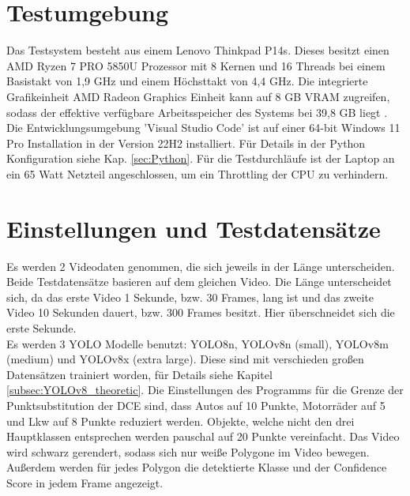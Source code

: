 \section{Testumgebung}{
	Das Testsystem besteht aus einem Lenovo Thinkpad P14s. Dieses besitzt einen AMD Ryzen 7 PRO 5850U Prozessor mit 8 Kernen und 16 Threads bei einem Basistakt von 1,9 GHz und einem Höchsttakt von 4,4 GHz. Die integrierte Grafikeinheit AMD Radeon Graphics Einheit kann auf 8 GB VRAM zugreifen, sodass der effektive verfügbare Arbeitsspeicher des Systems bei 39,8 GB liegt \citep{PSREF21}. Die Entwicklungsumgebung 'Visual Studio Code' ist auf einer 64-bit Windows 11 Pro Installation in der Version 22H2 installiert. Für Details in der Python Konfiguration siehe Kap. \ref{sec:Python}. Für die Testdurchläufe ist der Laptop an ein 65 Watt Netzteil angeschlossen, um ein Throttling der CPU zu verhindern.
}
\section{Einstellungen und Testdatensätze}
{%
	Es werden 2 Videodaten genommen, die sich jeweils in der Länge unterscheiden. Beide Testdatensätze basieren auf dem gleichen Video. Die Länge unterscheidet sich, da das erste Video 1 Sekunde, bzw. 30 Frames, lang ist und das zweite Video 10 Sekunden dauert, bzw. 300 Frames besitzt. Hier überschneidet sich die erste Sekunde. \\
	Es werden 3 YOLO Modelle benutzt: YOLO8n, YOLOv8n (small), YOLOv8m (medium) und YOLOv8x (extra large). Diese sind mit verschieden großen Datensätzen trainiert worden, für Details siehe Kapitel \ref{subsec:YOLOv8_theoretic}.
	Die Einstellungen des Programms für die Grenze der Punktsubstitution der DCE sind, dass Autos auf 10 Punkte, Motorräder auf 5 und Lkw auf 8 Punkte reduziert werden.
	Objekte, welche nicht den drei Hauptklassen entsprechen werden pauschal auf 20 Punkte vereinfacht. Das Video wird  schwarz gerendert, sodass sich nur weiße Polygone im Video bewegen. Außerdem werden für jedes Polygon die detektierte Klasse und der Confidence Score in jedem Frame angezeigt.

}
